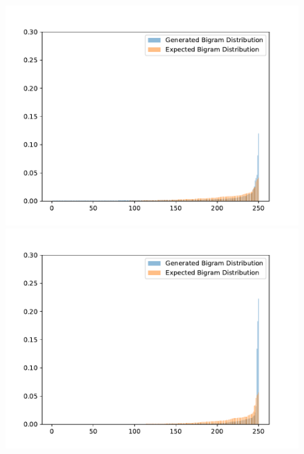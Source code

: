 \begin{figure}[H]
	\includegraphics[width=\linewidth]{img/plots/opensubtitles_not_reversed/bigram_distribution_comparison_step_1500000.pdf}
	\centering
	\small
	\endminipage\hfill
	\includegraphics[width=\linewidth]{img/plots/opensubtitles_not_reversed/bigram_distribution_comparison_step_2000000.pdf}
	\centering
	\small
	\endminipage\hfill

\end{figure}
